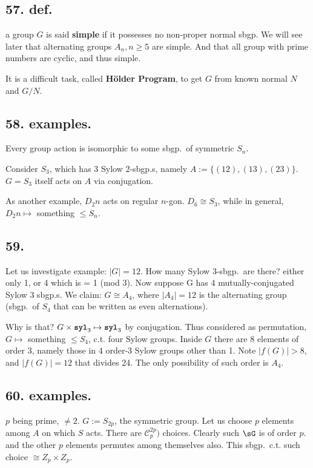 \documentclass[12pt]{article}
\newcommand\X\times%
\newcommand\Mp\mapsto%
\newcommand{\SF}[1]{ \mathscr{#1} }%
\newcommand{\Ss}[1]{\textsf{\textbf{#1}}}%
\newcommand{\Tw}[1]{\texttt{\textbf{#1}}}%
\begin{document}
\subsection*{57. def.} a group \(G\) is said \Ss{simple} if it possesses no non-proper normal sbgp. 
We will see later that alternating groups \(A_n, n \geq 5\) are simple. 
And that all group with prime numbers are cyclic, and thus simple. \par
It is a difficult task, called \Ss{H\"older Program}, to get \(G\) from known normal \(N\) and \(G/N\). 

\subsection*{58. examples.} Every group action is isomorphic to some sbgp.\ of symmetric \(S_n\). \par
Consider \(S_3\), which has 3 Sylow 2-sbgp.s, namely \(A := \{(12), (13), (23)\}\). 
\(G= S_3\) itself acts on \(A\) via conjugation. \par
As another example, \(D_2n\) acts on regular \(n\)-gon. 
\(D_6 \cong S_3\), while in general, \(D_2n \Mp\) something \(\leq S_n\). 

\subsection*{59.} Let us investigate example: \(|G| = 12\). How many Sylow 3-sbgp.\ are there? either only 1, or 4 which is = 1 (mod 3). 
Now suppose G has 4 mutually-conjugated Sylow 3 sbgp.s. 
We claim: \(G \cong A_4\), where \(|A_4| = 12\) is the alternating group (sbgp.\ of \(S_4\) that can be written as even alternations).

Why is that? \(G \X \Tw{syl}_3 \Mp \Tw{syl}_3\) by conjugation. 
Thus considered as permutation, \(G \Mp\) something \(\leq S_4\), c.t. four Sylow groups. 
Inside \(G\) there are 8 elements of order 3, namely those in 4 order-3 Sylow groups other than 1. 
Note \(|f(G)| > 8\), and \(|f(G)| = 12\) that divides 24. 
The only possibility of such order is \(A_4\). 

\subsection*{60. examples.}  \(p\) being prime, \(\neq 2\). 
\(G := S_{2p}\), the symmetric group. 
Let us choose \(p\) elements among \(A\) on which \(S\) acts. 
There are \(\SF C_p^{2p})\) choices. 
Clearly such \(\sG\) is of order \(p\). 
and the other \(p\) elements permutes among themselves also. 
This sbgp.\ c.t. such choice \(\cong Z_p \X Z_p\). 
\end{document}
